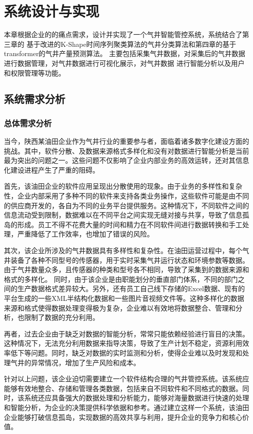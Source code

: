 \chapter{系统设计与实现}
本章根据企业的的痛点需求，设计并实现了一个气井智能管控系统，系统结合了第三章的
基于改进的K-Shape时间序列聚类算法的气井分类算法和第四章的基于transformer的气井产量预测算法。
主要包括采集气井数据，对采集后的气井数据进行数据管理，对气井数据进行可视化展示，对气井数据
进行智能分析以及用户和权限管理等功能。
\section{系统需求分析}
\subsection{总体需求分析}
当今，陕西某油田企业作为气井行业的重要参与者，面临着诸多数字化建设方面的挑战。其中，软件分散、及数据来源格式多样化和没有对数据进行智能分析是当前最为突出的问题之一。这些问题不仅影响了企业内部业务的高效运转，还对其信息化建设进程产生了严重的阻碍。

首先，该油田企业的软件应用呈现出分散使用的现象。由于业务的多样性和复杂性，企业内部采用了多种不同的软件来支持各类业务操作，这些软件可能是由不同的供应商开发的，各自为不同的业务平台提供服务。这种情况下，不同软件之间的信息流动受到限制，数据难以在不同平台之间实现无缝对接与共享，导致了信息孤岛的形成。员工不得不花费大量的时间和精力在不同软件间进行数据转换和手工处理，严重降低了工作效率，也增加了错误的风险。

其次，该企业所涉及的气井数据具有多样性和复杂性。在油田运营过程中，每个气井装备了各种不同型号的传感器，用于实时采集气井运行状态和环境参数等数据。由于气井数量众多，且传感器的种类和型号各不相同，导致了采集到的数据来源和格式的多样化。
同时，由于该企业是由职能划分的垂直部门体系，不同的部门之间的生产数据格式差异较大。另外，还有员工自己线下存储的Excel数据、现有的平台生成的一些XML半结构化数据和一些图片音视频文件等。这种多样化的数据来源和格式使得数据处理变得极为复杂，企业难以有效地将数据整合、管理和分析，也限制了数据的充分利用。

再者，过去企业由于缺乏对数据的智能分析，常常只能依赖经验进行盲目的决策。这种情况下，无法充分利用数据来指导决策，导致了生产计划不稳定，资源利用效率低下等问题。同时，缺乏对数据的实时监测和分析，使得企业难以及时发现和处理气井的异常情况，增加了生产风险和成本。

针对以上问题，该企业迫切需要建立一个软件结构合理的气井管控系统。该系统应能够有效地整合、存储和管理各类数据，包括来自不同软件和不同格式的数据。同时，该系统还应具备强大的数据处理和分析能力，能够对海量数据进行快速的处理和智能分析，为企业的决策提供科学依据和参考。通过建立这样一个系统，该油田企业能够打破信息孤岛，实现数据的高效共享与利用，提升企业的竞争力和核心价值。

